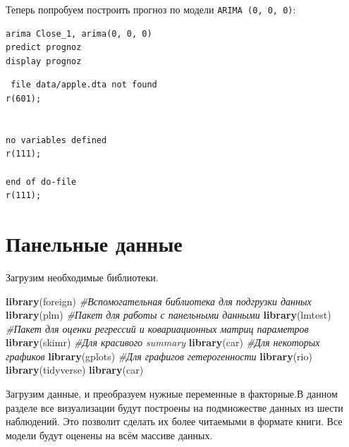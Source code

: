\documentclass[]{book}
\newenvironment{Shaded}{\begin{snugshade}}{\end{snugshade}}
\newcommand{\CommentTok}[1]{\textcolor[rgb]{0.56,0.35,0.01}{\textit{#1}}}
\newcommand{\KeywordTok}[1]{\textcolor[rgb]{0.13,0.29,0.53}{\textbf{#1}}}
\newcommand{\NormalTok}[1]{#1}
\newcommand{\OperatorTok}[1]{\textcolor[rgb]{0.81,0.36,0.00}{\textbf{#1}}}
\newcommand{\StringTok}[1]{\textcolor[rgb]{0.31,0.60,0.02}{#1}}
\begin{document}
Теперь попробуем построить прогноз по модели \texttt{ARIMA\ (0,\ 0,\ 0)}:

\begin{verbatim}
arima Close_1, arima(0, 0, 0)
predict prognoz
display prognoz
\end{verbatim}

\begin{verbatim}
 file data/apple.dta not found
r(601);


no variables defined
r(111);

end of do-file
r(111);
\end{verbatim}

\hypertarget{paneldata}{%
\chapter{Панельные данные}\label{paneldata}}

Загрузим необходимые библиотеки.

\begin{Shaded}
\begin{Highlighting}[]
\KeywordTok{library}\NormalTok{(foreign) }\CommentTok{#Вспомогательная библиотека для подгрузки данных}
\KeywordTok{library}\NormalTok{(plm) }\CommentTok{#Пакет для работы с панельными данными}
\KeywordTok{library}\NormalTok{(lmtest) }\CommentTok{#Пакет для оценки регрессий и ковариационных матриц параметров}
\KeywordTok{library}\NormalTok{(skimr) }\CommentTok{#Для красивого summary}
\KeywordTok{library}\NormalTok{(car) }\CommentTok{#Для некоторых графиков}
\KeywordTok{library}\NormalTok{(gplots) }\CommentTok{#Для графигов гетерогенности}
\KeywordTok{library}\NormalTok{(rio)}
\KeywordTok{library}\NormalTok{(tidyverse)}
\KeywordTok{library}\NormalTok{(car)}
\end{Highlighting}
\end{Shaded}

Загрузим данные, и преобразуем нужные переменные в факторные.В данном разделе все визуализации будут построены на подмножестве данных из шести наблюдений. Это позволит сделать их более читаемыми в формате книги. Все модели будут оценены на всём массиве данных.

\begin{Shaded}
\end{Shaded}
\end{document}
